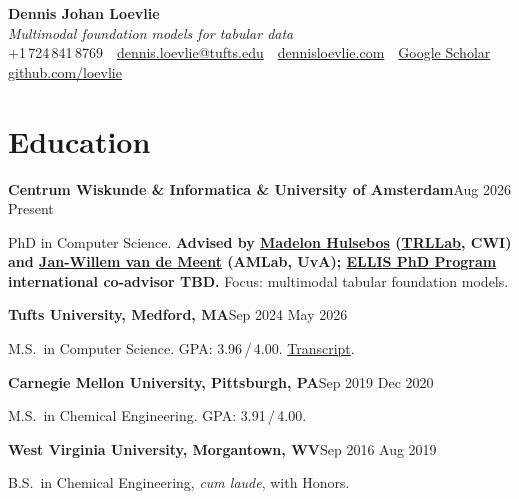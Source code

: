 \documentclass[10pt,letterpaper]{article}
\newcommand{\sansfam}{\sffamily}
\newcommand{\datestamp}[1]{{\sansfam\footnotesize\color{meta}\figureversion{lf}#1}}
\newcommand{\role}[2]{%
  \filbreak%
  \par\vspace{1pt}%
  \noindent\textbf{#1}\hfill\datestamp{#2}\par\nopagebreak}
\begin{document}
\thispagestyle{cvfirst}

\begin{center}
{\sansfam\fontsize{22pt}{26pt}\selectfont\bfseries\color{accent} Dennis Johan Loevlie}\\[2pt]
{\footnotesize\itshape\color{meta}Multimodal foundation models for tabular data}\\[3pt]
{\sansfam\footnotesize\color{meta}%
+1\,724\,841\,8769 \,\textperiodcentered\,
\href{mailto:dennis.loevlie@tufts.edu}{dennis.loevlie@tufts.edu} \,\textperiodcentered\,
\href{https://www.dennisloevlie.com}{dennisloevlie.com} \,\textperiodcentered\,
\href{https://scholar.google.com/citations?user=oGkEIYkAAAAJ}{Google Scholar} \,\textperiodcentered\,
\href{https://github.com/loevlie}{github.com/loevlie}}
\end{center}
\vspace{-4pt}{\color{rule}\rule{\linewidth}{0.5pt}}

\section{Education}

\role{Centrum Wiskunde \& Informatica \& University of Amsterdam}{Aug 2026 \textendash{} Present}
PhD in Computer Science. \textbf{Advised by \href{https://madelonhulsebos.github.io/}{Madelon Hulsebos} (\href{https://trl-lab.github.io/}{TRLLab}, CWI) and \href{https://jwvdm.github.io/}{Jan-Willem van de Meent} (AMLab, UvA); \href{https://ellis.eu/phd-postdoc}{ELLIS PhD Program} international co-advisor TBD.} Focus: multimodal tabular foundation models.

\role{Tufts University, Medford, MA}{Sep 2024 \textendash{} May 2026}
M.S.\ in Computer Science. GPA: 3.96\,/\,4.00. \href{https://loevlie.github.io/cv/Final_Tufts_Transcript.pdf}{Transcript}.

\role{Carnegie Mellon University, Pittsburgh, PA}{Sep 2019 \textendash{} Dec 2020}
M.S.\ in Chemical Engineering. GPA: 3.91\,/\,4.00.

\role{West Virginia University, Morgantown, WV}{Sep 2016 \textendash{} Aug 2019}
B.S.\ in Chemical Engineering, \textit{cum laude}, with Honors.
\end{document}
